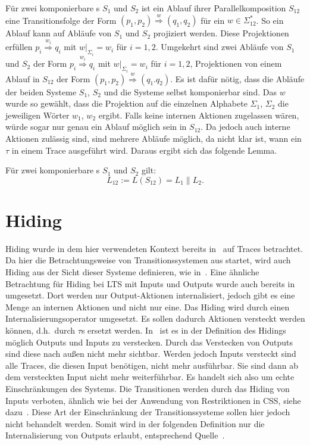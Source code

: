 Für zwei komponierbare \EIO{}s $S_1$ und $S_2$ ist ein Ablauf ihrer
Parallelkomposition $S_{12}$ eine Transitionsfolge der Form $(p_1,p_2)
\overset{w}{\Rightarrow} (q_1,q_2)$ für ein $w\in\Sigma_{12}^*$. So ein Ablauf
kann auf Abläufe von $S_1$ und $S_2$ projiziert werden. Diese Projektionen
erfüllen $p_i \overset{w_i}{\Rightarrow} q_i$ mit $w|_{\Sigma
_i}=w_i$ für $i=1,2$. Umgekehrt sind zwei Abläufe von $S_1$ und $S_2$ der Form
$p_i \overset{w_i}{\Rightarrow} q_i$ mit $w| _{\Sigma _i}= w_i$ für $i=1,2$,
Projektionen von einem Ablauf in $S_{12}$ der Form $(p_1,p_2)
\overset{w}{\Rightarrow} (q_1.q_2)$. Es ist dafür nötig, dass die Abläufe der
beiden Systeme $S_1$, $S_2$ und die Systeme selbst komponierbar sind. Das $w$ wurde so
gewählt, dass die Projektion auf die einzelnen Alphabete $\Sigma _1$, $\Sigma
_2$ die jeweiligen Wörter $w_1$, $w_2$ ergibt. Falls keine internen Aktionen
zugelassen wären, würde sogar nur genau ein Ablauf möglich sein in $S_{12}$. Da
jedoch auch interne Aktionen zulässig sind, sind mehrere Abläufe möglich, da
nicht klar ist, wann ein $\tau$ in einem Trace ausgeführt wird. Daraus ergibt
sich das folgende Lemma.

\begin{lem}
\label{LemmaSprache}
  Für zwei komponierbare \EIO{}s $S_1$ und $S_2$ gilt: \[L_{12} := L(S_{12}) =
  L_1\|L_2.\]
\end{lem}

\section{Hiding}

Hiding wurde in dem hier verwendeten Kontext bereits in~\cite{Chilton2013} auf
Traces betrachtet. Da hier die Betrachtungsweise von Transitionssystemen aus
startet, wird auch Hiding aus der Sicht dieser Systeme definieren, wie
in~\cite{Schlosser2012BA}. Eine ähnliche Betrachtung für Hiding bei LTS mit
Inputs und Outputs wurde auch bereits in~\cite{Lynch1996} umgesetzt. Dort
werden nur Output-Aktionen internalisiert, jedoch gibt es eine Menge an
internen Aktionen und nicht nur eine. Das Hiding wird durch einen
Internalisierungsoperator umgesetzt. Es sollen dadurch Aktionen versteckt
werden können, d.h.\ durch $\tau$s ersetzt werden. In~\cite{Chilton2013} ist es
in der Definition des Hidings möglich Outputs und Inputs zu verstecken. Durch
das Verstecken von Outputs sind diese nach außen nicht mehr sichtbar. Werden
jedoch Inputs versteckt sind alle Traces, die diesen Input benötigen, nicht
mehr ausführbar. Sie sind dann ab dem versteckten Input nicht mehr
weiterführbar. Es handelt sich also um echte Einschränkungen des Systems. Die
Transitionen werden durch das Hiding von Inputs verboten, ähnlich wie bei der Anwendung
von Restriktionen in CSS, siehe dazu~\cite{Milner1989}. Diese Art der
Einschränkung der Transitionssysteme sollen hier jedoch nicht behandelt werden.
Somit wird in der folgenden Definition nur die Internalisierung von Outputs
erlaubt, entsprechend Quelle~\cite{Schlosser2012BA}.

